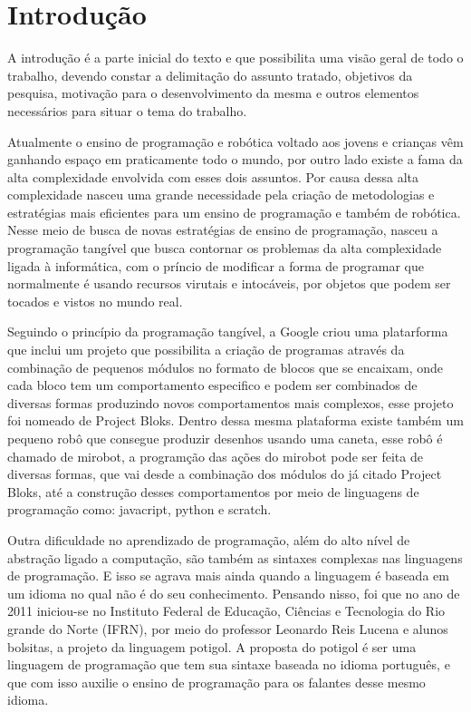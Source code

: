 \chapter{Introdução}\label{cap:introducao}

A introdução é a parte inicial do texto e que possibilita uma visão geral de
todo o trabalho, devendo constar a delimitação do assunto tratado, objetivos da
pesquisa, motivação para o desenvolvimento da mesma e outros elementos
necessários para situar o tema do trabalho.

Atualmente o ensino de programação e robótica voltado aos jovens e crianças vêm
ganhando espaço em praticamente todo o mundo, por outro lado existe a fama da
alta complexidade envolvida com esses dois assuntos. Por causa dessa alta
complexidade nasceu uma grande necessidade pela criação de metodologias e
estratégias mais eficientes para um ensino de programação e também de robótica.
Nesse meio de busca de novas estratégias de ensino de programação, nasceu a
programação tangível que busca contornar os problemas da alta complexidade
ligada à informática, com o príncio de modificar a forma de programar que
normalmente é usando recursos virutais e intocáveis, por objetos que podem ser
tocados e vistos no mundo real.

Seguindo o princípio da programação tangível, a Google criou uma platarforma
que inclui um projeto que possibilita a criação de programas através da
combinação de pequenos módulos no formato de blocos que se encaixam, onde cada
bloco tem um comportamento especifico e podem ser combinados de diversas formas
produzindo novos comportamentos mais complexos, esse projeto foi nomeado de
Project Bloks. Dentro dessa mesma plataforma existe também um pequeno robô que
consegue produzir desenhos usando uma caneta, esse robô é chamado de mirobot, a
programção das ações do mirobot pode ser feita de diversas formas, que vai
desde a combinação dos módulos do já citado Project Bloks, até a construção
desses comportamentos por meio de linguagens de programação como: javacript,
python e scratch.

Outra dificuldade no aprendizado de programação, além do alto nível de
abstração ligado a computação, são também as sintaxes complexas nas linguagens
de programação. E isso se agrava mais ainda quando a linguagem é baseada em um
idioma no qual não é do seu conhecimento. Pensando nisso, foi que no ano de
2011 iniciou-se no Instituto Federal de Educação, Ciências e Tecnologia do Rio
grande do Norte (IFRN), por meio do professor Leonardo Reis Lucena e alunos
bolsitas, a projeto da linguagem potigol. A proposta do potigol é ser uma
linguagem de programação que tem sua sintaxe baseada no idioma português, e que
com isso auxilie o ensino de programação para os falantes desse mesmo idioma.

